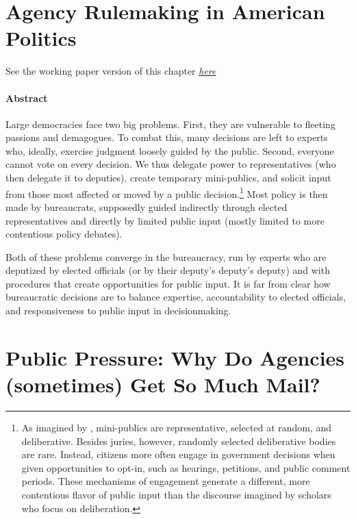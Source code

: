 \documentclass[
]{book}
\begin{document}
\hypertarget{agency-rulemaking-in-american-politics}{%
\chapter{Agency Rulemaking in American Politics}\label{agency-rulemaking-in-american-politics}}

See the working paper version of this chapter \href{https://judgelord.github.io/dissertation/MacroRulemaking.pdf}{\emph{here}}

\hypertarget{abstract}{%
\subsubsection*{Abstract}\label{abstract}}

Large democracies face two big problems. First, they are vulnerable to fleeting passions and demagogues. To combat this, many decisions are left to experts who, ideally, exercise judgment loosely guided by the public. Second, everyone cannot vote on every decision. We thus delegate power to representatives (who then delegate it to deputies), create temporary mini-publics, and solicit input from those most affected or moved by a public decision.\footnote{As imagined by \citet{Dahl1989}, mini-publics are representative, selected at random, and deliberative. Besides juries, however, randomly selected deliberative bodies are rare. Instead, citizens more often engage in government decisions when given opportunities to opt-in, such as hearings, petitions, and public comment periods. These mechanisms of engagement generate a different, more contentious flavor of public input than the discourse imagined by scholars who focus on deliberation.} Most policy is then made by bureaucrats, supposedly guided indirectly through elected representatives and directly by limited public input (mostly limited to more contentious policy debates).

Both of these problems converge in the bureaucracy, run by experts who are deputized by elected officials (or by their deputy's deputy's deputy) and with procedures that create opportunities for public input. It is far from clear how bureaucratic decisions are to balance expertise, accountability to elected officials, and responsiveness to public input in decisionmaking.

\hypertarget{public-pressure-why-do-agencies-sometimes-get-so-much-mail}{%
\chapter{Public Pressure: Why Do Agencies (sometimes) Get So Much Mail?}\label{public-pressure-why-do-agencies-sometimes-get-so-much-mail}}
\end{document}
